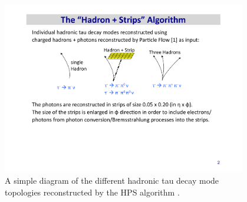 \begin{figure}[hbt]
\begin{center}
\includegraphics[width=0.95\textwidth]{figures/DP2014_015-fig.pdf}
\caption{A simple diagram of the different hadronic tau decay mode topologies reconstructed by the HPS algorithm \cite{CMS-DP-2014-015}.}
\label{fig:tau-modes}
\end{center}
\end{figure}

